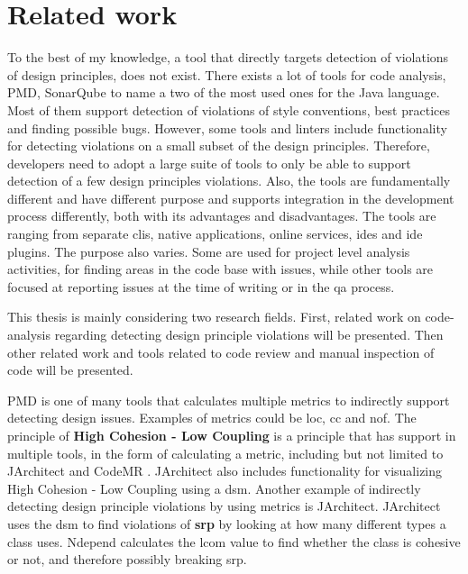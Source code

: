 \documentclass{report}
\begin{document}
\chapter{Related work}
\label{relatedwork}

To the best of my knowledge, a tool that directly targets detection of violations of design principles, does not exist. There exists a lot of tools for code analysis, PMD\cite{pmd}, SonarQube\cite{sonarqube} to name a two of the most used ones for the Java language. Most of them support detection of violations of style conventions, best practices and finding possible bugs. However, some tools and linters include functionality for detecting violations on a small subset of the design principles. Therefore, developers need to adopt a large suite of tools to only be able to support detection of a few design principles violations. Also, the tools are fundamentally different and have different purpose and supports integration in the development process differently, both with its advantages and disadvantages. The tools are ranging from separate \gls{cli}s, native applications, online services, \gls{ide}s and \gls{ide} plugins. The purpose also varies. Some are used for project level analysis activities, for finding areas in the code base with issues, while other tools are focused at reporting issues at the time of writing or in the \gls{qa} process. 

This thesis is mainly considering two research fields. First, related work on code-analysis regarding detecting design principle violations will be presented. Then other related work and tools related to code review and manual inspection of code will be presented.

PMD \cite{pmd} is one of many tools that calculates multiple metrics to indirectly support detecting design issues. Examples of metrics could be \gls{loc}, \gls{cc} and \gls{nof}. The principle of \textbf{High Cohesion - Low Coupling} is a principle that has support in multiple tools, in the form of calculating a metric, including but not limited to JArchitect \cite{jarchitect} and CodeMR \cite{codemr}. JArchitect \cite{jarchitect} also includes functionality for visualizing  High Cohesion - Low Coupling using a \gls{dsm}. Another example of indirectly detecting design principle violations by using metrics is JArchitect. JArchitect uses the \gls{dsm} to find violations of \textbf{\gls{srp}} by looking at how many different types a class uses. Ndepend \cite{ndepend} calculates the \gls{lcom} value to find whether the class is cohesive or not, and therefore possibly breaking \gls{srp}. 
\end{document}
